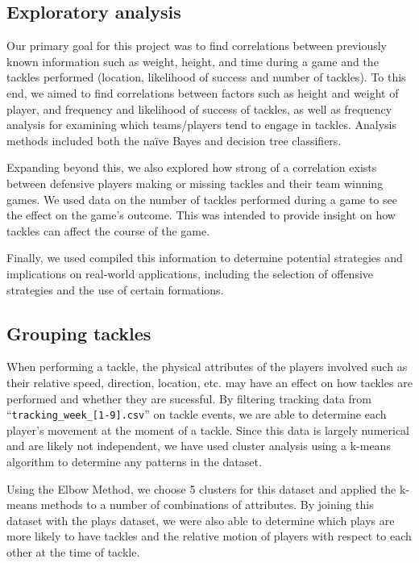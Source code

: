\documentclass[bibtex, sigconf, hyperref={colorlinks=true,linkcolor=blue,urlcolor=blue}]{acmart}
\begin{document}
\subsection{Exploratory analysis}

Our primary goal for this project was to find correlations between previously
known information such as weight, height, and time during a game and the
tackles performed (location, likelihood of success and number of tackles). To
this end, we aimed to find correlations between factors such as height and
weight of player, and frequency and likelihood of success of tackles, as well
as frequency analysis for examining which teams/players tend to engage in
tackles. Analysis methods included both the na\"ive Bayes and decision tree
classifiers.

Expanding beyond this, we also explored how strong of a correlation exists
between defensive players making or missing tackles and their team winning
games. We used data on the number of tackles performed during a game to see the
effect on the game's outcome. This was intended to provide insight on how
tackles can affect the course of the game.

Finally, we used compiled this information to determine potential strategies
and implications on real-world applications, including the selection of
offensive strategies and the use of certain formations.

\subsection{Grouping tackles}

When performing a tackle, the physical attributes of the players involved such
as their relative speed, direction, location, etc. may have an effect on how
tackles are performed and whether they are sucessful. By filtering tracking
data from ``\verb|tracking_week_[1-9].csv|'' on tackle events, we are able to
determine each player's movement at the moment of a tackle. Since this data is
largely numerical and are likely not independent, we have used cluster analysis
using a k-means algorithm to determine any patterns in the dataset.

Using the Elbow Method, we choose 5 clusters for this dataset and applied the
k-means methods to a number of combinations of attributes. By joining this
dataset with the plays dataset, we were also able to determine which plays are
more likely to have tackles and the relative motion of players with respect to
each other at the time of tackle.
\end{document}
